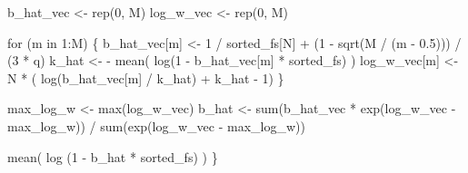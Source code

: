 \documentclass[
  letterpaper,
  DIV=11,
  numbers=noendperiod]{scrartcl}
\newenvironment{Shaded}{\begin{snugshade}}{\end{snugshade}}
\newcommand{\ControlFlowTok}[1]{\textcolor[rgb]{0.00,0.23,0.31}{#1}}
\newcommand{\DecValTok}[1]{\textcolor[rgb]{0.68,0.00,0.00}{#1}}
\newcommand{\FloatTok}[1]{\textcolor[rgb]{0.68,0.00,0.00}{#1}}
\newcommand{\FunctionTok}[1]{\textcolor[rgb]{0.28,0.35,0.67}{#1}}
\newcommand{\NormalTok}[1]{\textcolor[rgb]{0.00,0.23,0.31}{#1}}
\newcommand{\OtherTok}[1]{\textcolor[rgb]{0.00,0.23,0.31}{#1}}
\newcommand{\SpecialCharTok}[1]{\textcolor[rgb]{0.37,0.37,0.37}{#1}}
\begin{document}
\begin{Shaded}
\begin{Highlighting}[]
\NormalTok{  b\_hat\_vec }\OtherTok{\textless{}{-}} \FunctionTok{rep}\NormalTok{(}\DecValTok{0}\NormalTok{, M)}
\NormalTok{  log\_w\_vec }\OtherTok{\textless{}{-}} \FunctionTok{rep}\NormalTok{(}\DecValTok{0}\NormalTok{, M)}

  \ControlFlowTok{for}\NormalTok{ (m }\ControlFlowTok{in} \DecValTok{1}\SpecialCharTok{:}\NormalTok{M) \{}
\NormalTok{    b\_hat\_vec[m] }\OtherTok{\textless{}{-}} \DecValTok{1} \SpecialCharTok{/}\NormalTok{ sorted\_fs[N] }\SpecialCharTok{+}\NormalTok{ (}\DecValTok{1} \SpecialCharTok{{-}} \FunctionTok{sqrt}\NormalTok{(M }\SpecialCharTok{/}\NormalTok{ (m }\SpecialCharTok{{-}} \FloatTok{0.5}\NormalTok{))) }\SpecialCharTok{/}\NormalTok{ (}\DecValTok{3} \SpecialCharTok{*}\NormalTok{ q)}
\NormalTok{    k\_hat }\OtherTok{\textless{}{-}} \SpecialCharTok{{-}} \FunctionTok{mean}\NormalTok{( }\FunctionTok{log}\NormalTok{(}\DecValTok{1} \SpecialCharTok{{-}}\NormalTok{ b\_hat\_vec[m] }\SpecialCharTok{*}\NormalTok{ sorted\_fs) )}
\NormalTok{    log\_w\_vec[m] }\OtherTok{\textless{}{-}}\NormalTok{ N }\SpecialCharTok{*}\NormalTok{ ( }\FunctionTok{log}\NormalTok{(b\_hat\_vec[m] }\SpecialCharTok{/}\NormalTok{ k\_hat) }\SpecialCharTok{+}\NormalTok{ k\_hat }\SpecialCharTok{{-}} \DecValTok{1}\NormalTok{)}
\NormalTok{  \}}

\NormalTok{  max\_log\_w }\OtherTok{\textless{}{-}} \FunctionTok{max}\NormalTok{(log\_w\_vec)}
\NormalTok{  b\_hat }\OtherTok{\textless{}{-}} \FunctionTok{sum}\NormalTok{(b\_hat\_vec }\SpecialCharTok{*} \FunctionTok{exp}\NormalTok{(log\_w\_vec }\SpecialCharTok{{-}}\NormalTok{ max\_log\_w)) }\SpecialCharTok{/}
    \FunctionTok{sum}\NormalTok{(}\FunctionTok{exp}\NormalTok{(log\_w\_vec }\SpecialCharTok{{-}}\NormalTok{ max\_log\_w))}

  \FunctionTok{mean}\NormalTok{( }\FunctionTok{log}\NormalTok{ (}\DecValTok{1} \SpecialCharTok{{-}}\NormalTok{ b\_hat }\SpecialCharTok{*}\NormalTok{ sorted\_fs) )}
\NormalTok{\}}
\end{Highlighting}
\end{Shaded}
\end{document}
